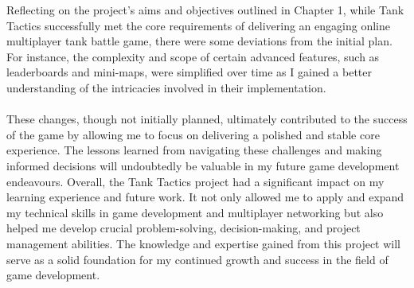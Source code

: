 Reflecting on the project's aims and objectives outlined in Chapter 1, while Tank Tactics successfully met the core requirements of delivering an engaging online multiplayer tank battle game, there were some deviations from the initial plan. For instance, the complexity and scope of certain advanced features, such as leaderboards and mini-maps, were simplified over time as I gained a better understanding of the intricacies involved in their implementation.
\\
\noindent
\\
These changes, though not initially planned, ultimately contributed to the success of the game by allowing me to focus on delivering a polished and stable core experience. The lessons learned from navigating these challenges and making informed decisions will undoubtedly be valuable in my future game development endeavours. Overall, the Tank Tactics project had a significant impact on my learning experience and future work. It not only allowed me to apply and expand my technical skills in game development and multiplayer networking but also helped me develop crucial problem-solving, decision-making, and project management abilities. The knowledge and expertise gained from this project will serve as a solid foundation for my continued growth and success in the field of game development.